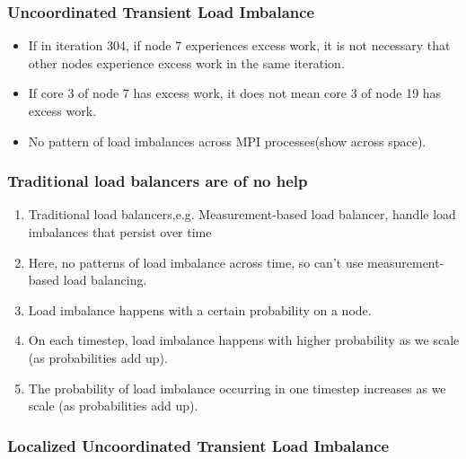 \begin{frame}
\frametitle{Uncoordinated Transient Load Imbalance}
\begin{itemize}
\item \small If in iteration 304, if node 7 experiences excess work, it is not necessary that other nodes experience excess work in the same iteration.
\item \small If core 3 of node 7 has excess work, it does not mean core 3 of node 19 has excess work.
\item \small No pattern of load imbalances across MPI processes(show across space).
\end{itemize}
\end{frame}

\begin{frame}
\frametitle{Traditional load balancers are of no help }
\begin{enumerate}
\item \small Traditional load balancers,e.g. Measurement-based load balancer, handle load imbalances that persist over time
\item \small Here, no patterns of load imbalance across time, so can't use measurement-based load balancing.
\item \small Load imbalance happens with a certain probability on a node.
\item \small On each timestep, load imbalance happens with higher probability as we scale (as probabilities add up).
\item \small The probability of load imbalance occurring in one timestep increases as we scale (as probabilities add up).
\end{enumerate}
\end{frame}

\begin{frame}
\frametitle{Localized Uncoordinated Transient Load Imbalance}
\begin{itemize}

\end{itemize}
\end{frame}








